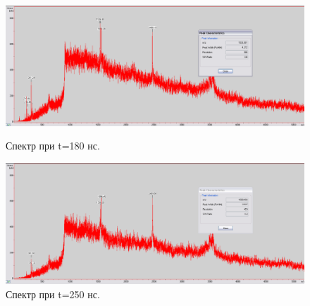\documentclass[12pt]{article}
\begin{document}
\begin{flushleft}
\begin{figure}[!h]
\begin{center}
\begin{minipage}[h]{0.4\linewidth}
\includegraphics[width=1.2\linewidth]{15}
\caption{Спектр при t=180 нс.} %
\label{ris:experimoriginal} %
\end{minipage}
\hfill 
\begin{minipage}[h]{0.4\linewidth}
\includegraphics[width=1.2\linewidth]{16}
\caption{Спектр при t=250 нс.}
\label{ris:experimcoded}
\end{minipage}
\end{center}
\end{figure}
\newpage


\end{flushleft}
\end{document}
